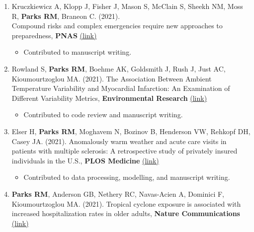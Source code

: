 \begin{enumerate}
    \item Kruczkiewicz A, Klopp J, Fisher J, Mason S, McClain S, Sheekh NM, Moss R, \textbf{Parks RM}, Braneon C. (2021).\\Compound risks and complex emergencies require new approaches to preparedness, \textbf{PNAS} \href{https://www.pnas.org/content/118/19/e2106795118}{(link)} 

    \begin{itemize}
        \item Contributed to manuscript writing.
    \end{itemize}

    \item Rowland S, \textbf{Parks RM}, Boehme AK, Goldsmith J, Rush J, Just AC, Kioumourtzoglou MA. (2021). The Association Between Ambient Temperature Variability and Myocardial Infarction: An Examination of Different Variability Metrics, \textbf{Environmental Research} \href{https://www.sciencedirect.com/science/article/pii/S0013935121005016}{(link)}

    \begin{itemize}
        \item Contributed to code review and manuscript writing.
    \end{itemize}


     \item Elser H, \textbf{Parks RM}, Moghavem N, Bozinov B, Henderson VW, Rehkopf DH, Casey JA. (2021). Anomalously warm weather and acute care visits in patients with multiple sclerosis: A retrospective study of privately insured individuals in the U.S., \textbf{PLOS Medicine} \href{https://journals.PLOS.org/PLOSmedicine/article?id=10.1371/journal.pmed.1003580}{(link)} 

    \begin{itemize}
        \item Contributed to data processing, modelling, and manuscript writing.
    \end{itemize}

     \item \textbf{Parks RM}, Anderson GB, Nethery RC, Navas-Acien A, Dominici F, Kioumourtzoglou MA. (2021). Tropical cyclone exposure is associated with increased hospitalization rates in older adults, \textbf{Nature Communications} \href{https://www.nature.com/articles/s41467-021-21777-1}{(link)}


\end{enumerate}
